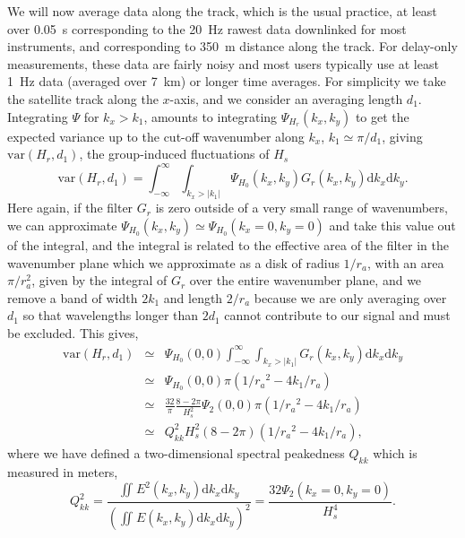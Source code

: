 {We will now average data along the track, which is the usual practice, at least over 0.05~s corresponding to the 20~Hz rawest data downlinked for most instruments, and corresponding to 350~m distance along the track. For delay-only measurements, these data are fairly noisy and most users typically use at least 1~Hz data (averaged over 7~km) or longer time averages. For simplicity we take the satellite track along the $x$-axis, and we consider an averaging length $d_1$. 
Integrating $\Psi$ for $k_x > k_1$, amounts to integrating $\Psi_{H_r}(k_x,k_y)$ to get the expected variance up to the  cut-off wavenumber along $k_x$, $k_1\simeq \pi / d_1 $, giving $\mathrm{var}(H_{r},d_1)$, the group-induced fluctuations of $\widehat{H}_s$ 
\begin{equation}
\mathrm{var}(H_{r}, d_1) = \int_{-\infty}^{\infty} \int_{k_x > |k_1| } \Psi_{H_0}(k_x,k_y)  G_{r}(k_x,k_y) \mathrm{d}k_x \mathrm{d}k_y. \label{eq:varfromspec2D}
\end{equation}
Here again, if the filter $G_{r}$ is zero outside of a very small range of wavenumbers, we can approximate $\Psi_{H_0}(k_x,k_y) \simeq \Psi_{H_0}(k_x=0,k_y=0)$ and take this value out of the integral, and the integral is related to the effective area of the filter in the wavenumber plane which we approximate as a disk of radius $1/r_a$, with an area $\pi /r_a^2$, given by the integral of $G_{r}$ over the entire wavenumber plane, and we remove a band of width $2 k_1$ and length $2/r_a$ because we are only averaging over $d_1$ so that wavelengths longer than $2 d_1$ cannot contribute to our signal and must be excluded. This gives,  
\begin{eqnarray}
    \mathrm{var}(H_{r},d_1) &\simeq&  \Psi_{H_0}(0,0)   \int_{-\infty}^{\infty} \int_{k_x > |k_1| } G_{r}(k_x,k_y) \mathrm{d}k_x \mathrm{d}k_y \nonumber \\
    &\simeq&  \Psi_{H_0}(0,0)  \pi\left(1 / {r_a}^2 - 4 k_1/ r_a \right) \nonumber\\
    &\simeq&  \frac{32}{\pi} \frac{8 - 2\pi}{H_s^2}   \Psi_2(0,0)   \pi  \left(1 / {r_a}^2 - 4 k_1/ r_a \right) \nonumber\\
    &\simeq&   Q_{kk}^2 H_s^2(8 - 2 \pi) \left(1 / {r_a}^2 - 4 k_1/ r_a \right)  , 
\end{eqnarray}
where we have defined 
a two-dimensional spectral peakedness $Q_{kk}$ which is measured in meters,
\begin{equation}
    Q_{kk}^2 = \frac{\iint_{} E^2(k_x,k_y)\mathrm{d}k_x\mathrm{d}k_y}{\left(\iint_{}E(k_x,k_y) \mathrm{d}k_x\mathrm{d}k_y\right)^2} = \frac{32 \Psi_2(k_x=0,k_y=0)}{H_s^4}.
\label{eq:bandwith_2D}
\end{equation}


}
